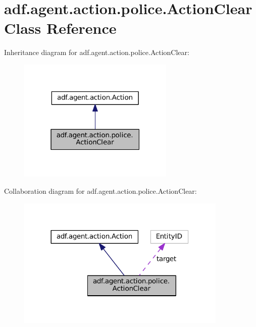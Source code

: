 \hypertarget{classadf_1_1agent_1_1action_1_1police_1_1ActionClear}{}\section{adf.\+agent.\+action.\+police.\+Action\+Clear Class Reference}
\label{classadf_1_1agent_1_1action_1_1police_1_1ActionClear}


Inheritance diagram for adf.\+agent.\+action.\+police.\+Action\+Clear\+:
\nopagebreak
\begin{figure}[H]
\begin{center}
\leavevmode
\includegraphics[width=211pt]{classadf_1_1agent_1_1action_1_1police_1_1ActionClear__inherit__graph}
\end{center}
\end{figure}


Collaboration diagram for adf.\+agent.\+action.\+police.\+Action\+Clear\+:
\nopagebreak
\begin{figure}[H]
\begin{center}
\leavevmode
\includegraphics[width=284pt]{classadf_1_1agent_1_1action_1_1police_1_1ActionClear__coll__graph}
\end{center}
\end{figure}
